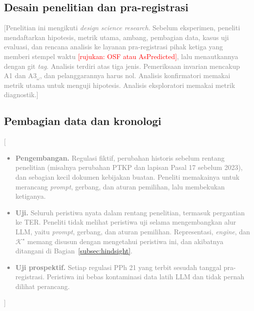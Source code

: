 \documentclass[journal,a4paper]{IEEEtran}
\newcommand{\en}[1]{\textit{#1}}
\newcommand{\K}{\mathcal{K}}
\newcommand{\emas}{\star}
\newif\ifrancangan \rancangantrue
\newcommand{\isian}[1]{\ifrancangan\textcolor{gray}{[#1]}\fi}
\newcommand{\rujuk}[1]{\textcolor{red}{[rujukan: #1]}}
\begin{document}
\subsection{Desain penelitian dan pra-registrasi}
\isian{Penelitian ini mengikuti \en{design science research}. Sebelum eksperimen, peneliti mendaftarkan hipotesis, metrik utama, ambang, pembagian data, kasus uji evaluasi, dan rencana analisis ke layanan pra-registrasi pihak ketiga yang memberi stempel waktu \rujuk{OSF atau AsPredicted}, lalu menautkannya dengan git \en{tag}. Analisis terdiri atas tiga jenis. Pemeriksaan invarian mencakup A1 dan A3$_\omega$, dan pelanggarannya harus nol. Analisis konfirmatori memakai metrik utama untuk menguji hipotesis. Analisis eksploratori memakai metrik diagnostik.}

\subsection{Pembagian data dan kronologi}
\label{subsec:pembagian}
\isian{
\begin{itemize}[leftmargin=*,nosep]
  \item \textbf{Pengembangan.} Regulasi fiktif, perubahan historis sebelum rentang penelitian (misalnya perubahan PTKP dan lapisan Pasal 17 sebelum 2023), dan sebagian kecil dokumen kebijakan buatan. Peneliti memakainya untuk merancang \en{prompt}, gerbang, dan aturan pemilihan, lalu membekukan ketiganya.
  \item \textbf{Uji.} Seluruh peristiwa nyata dalam rentang penelitian, termasuk pergantian ke TER. Peneliti tidak melihat peristiwa uji selama mengembangkan alur LLM, yaitu \en{prompt}, gerbang, dan aturan pemilihan. Representasi, \en{engine}, dan $\K^{\emas}$ memang disusun dengan mengetahui peristiwa ini, dan akibatnya ditangani di Bagian~\ref{subsec:hindsight}.
  \item \textbf{Uji prospektif.} Setiap regulasi PPh 21 yang terbit sesudah tanggal pra-registrasi. Peristiwa ini bebas kontaminasi data latih LLM dan tidak pernah dilihat perancang.
\end{itemize}}
\end{document}
